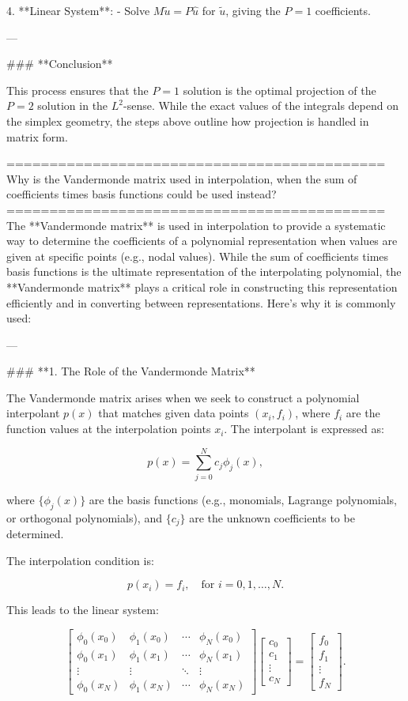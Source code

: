 4. **Linear System**:
   - Solve \( M \tilde{u} = P \hat{u} \) for \(\tilde{u}\), giving the \( P=1 \) coefficients.

---

### **Conclusion**

This process ensures that the \( P=1 \) solution is the optimal projection of the \( P=2 \) solution in the \( L^2 \)-sense. While the exact values of the integrals depend on the simplex geometry, the steps above outline how projection is handled in matrix form.


============================================
Why is the Vandermonde matrix used in interpolation, when the sum of coefficients times basis functions could be used instead?
============================================
The **Vandermonde matrix** is used in interpolation to provide a systematic way to determine the coefficients of a polynomial representation when values are given at specific points (e.g., nodal values). While the sum of coefficients times basis functions is the ultimate representation of the interpolating polynomial, the **Vandermonde matrix** plays a critical role in constructing this representation efficiently and in converting between representations. Here’s why it is commonly used:

---

### **1. The Role of the Vandermonde Matrix**

The Vandermonde matrix arises when we seek to construct a polynomial interpolant \( p(x) \) that matches given data points \((x_i, f_i)\), where \( f_i \) are the function values at the interpolation points \( x_i \). The interpolant is expressed as:

\[
p(x) = \sum_{j=0}^N c_j \phi_j(x),
\]

where \( \{\phi_j(x)\} \) are the basis functions (e.g., monomials, Lagrange polynomials, or orthogonal polynomials), and \( \{c_j\} \) are the unknown coefficients to be determined.

The interpolation condition is:

\[
p(x_i) = f_i, \quad \text{for } i = 0, 1, \dots, N.
\]

This leads to the linear system:

\[
\begin{bmatrix}
\phi_0(x_0) & \phi_1(x_0) & \cdots & \phi_N(x_0) \\
\phi_0(x_1) & \phi_1(x_1) & \cdots & \phi_N(x_1) \\
\vdots & \vdots & \ddots & \vdots \\
\phi_0(x_N) & \phi_1(x_N) & \cdots & \phi_N(x_N)
\end{bmatrix}
\begin{bmatrix}
c_0 \\
c_1 \\
\vdots \\
c_N
\end{bmatrix}
=
\begin{bmatrix}
f_0 \\
f_1 \\
\vdots \\
f_N
\end{bmatrix}.
\]

